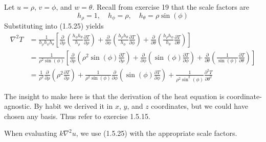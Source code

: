 \documentclass[a4paper]{article}
\begin{document}

Let \( u = \rho \), \( v = \phi \), and \( w = \theta \). Recall from exercise 19 that the scale factors are 
\[
	h_{\rho} = 1, \quad h_{\phi} = \rho, \quad h_{\theta} = \rho \sin\!\left(\phi\right)  
\]
Substituting into (1.5.25) yields
\begin{align*}
	\nabla^{2}T & = \frac{1}{h_{\rho}h_{\phi}h_{\theta}}\!\left[ \frac{\partial }{\partial \rho}\!\left( \frac{h_{\phi}h_{\theta}}{h_{\rho}}\frac{\partial T}{\partial \rho} \right) + \frac{\partial }{\partial \phi}\!\left( \frac{h_{\rho}h_{\theta}}{h_{\phi}}\frac{\partial T}{\partial \phi} \right) + \frac{\partial }{\partial \theta}\!\left( \frac{h_{\rho}h_{\phi}}{h_{\theta}}\frac{\partial T}{\partial \theta} \right) \right] \\
	 & = \frac{1}{\rho^{2}\sin\!\left(\phi\right)}\!\left[ \frac{\partial }{\partial \rho}\!\left( \rho^{2}\sin\!\left(\phi\right) \frac{\partial T}{\partial \rho}\right) + \frac{\partial }{\partial \phi}\!\left( \sin\!\left(\phi\right) \frac{\partial T}{\partial \phi} \right) + \frac{\partial }{\partial \theta}\!\left( \frac{1}{\sin\!\left(\phi\right)}\frac{\partial T}{\partial \theta} \right) \right] \\ 
	 & = \frac{1}{\rho^{2}}\frac{\partial }{\partial \rho}\!\left( \rho^{2}\frac{\partial T}{\partial \rho} \right) + \frac{1}{\rho^{2}\sin\!\left(\phi\right)}\frac{\partial }{\partial \phi}\!\left( \sin\!\left(\phi\right) \frac{\partial T}{\partial \phi} \right) + \frac{1}{\rho^{2}\sin^{2}\!\left(\phi\right)}\frac{\partial^2 T}{\partial \theta^2}
\end{align*}


The insight to make here is that the derivation of the heat equation is coordinate-agnostic. By habit we derived it in \( x \), \( y \), and \( z \) coordinates, but we could have chosen any basis. Thus refer to exercise 1.5.15.

When evaluating \( k \nabla^{2}u \), we use (1.5.25) with the appropriate scale factors.

\newpage

\end{document}
